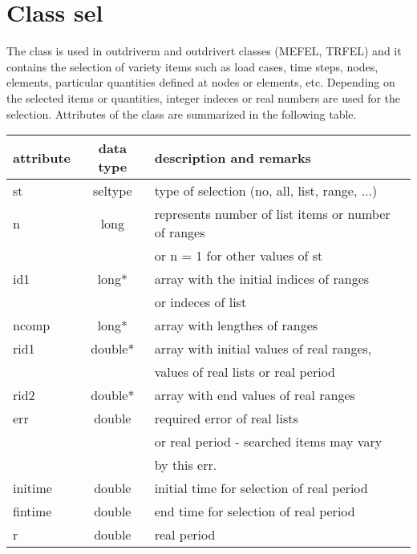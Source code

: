 \section {Class {\sf sel}} \label{sel}
The class is used in {\sf outdriverm} and {\sf outdrivert} classes (MEFEL, TRFEL) and it contains the 
selection of variety items such as load cases, time steps, nodes, elements, particular quantities 
defined at nodes or elements, etc. Depending on the selected items or quantities, 
integer indeces or real numbers are used for the selection. Attributes of the class are summarized 
in the following table.

\begin{center}
\begin{tabular}{|l|c|l|}
\hline
attribute   & data type &     description and remarks
\\ \hline \hline
{\sf st}     & {\sf seltype} & type of selection (no, all, list, range, ...)
\\ \hline
{\sf n}     & {\sf long} &   represents number of list items or number of ranges\\
            &           &   or {\sf n} = 1 for other values of {\sf st}
\\ \hline
{\sf id1}    & {\sf long*} &  array with the initial indices of ranges\\
            &             &  or indeces of list
\\ \hline
{\sf ncomp}   & {\sf long*} &  array with lengthes of ranges
\\ \hline
{\sf rid1}   & {\sf double*} &  array with initial values of real ranges,\\
            &              &   values of real lists or real period
\\ \hline
{\sf rid2}   & {\sf double*} &  array with end values of real ranges
\\ \hline
{\sf err}    & {\sf double} &  required error of real lists \\
            &              &  or real period - searched items may vary  \\
            &              &  by this {\sf err}.
\\ \hline
{\sf initime} & {\sf double} &  initial time for selection of real period
\\ \hline
{\sf fintime} & {\sf double} &  end time for selection of real period
\\ \hline
{\sf r}     & {\sf double} &  real period
\\ \hline
\end{tabular}
\end{center}


